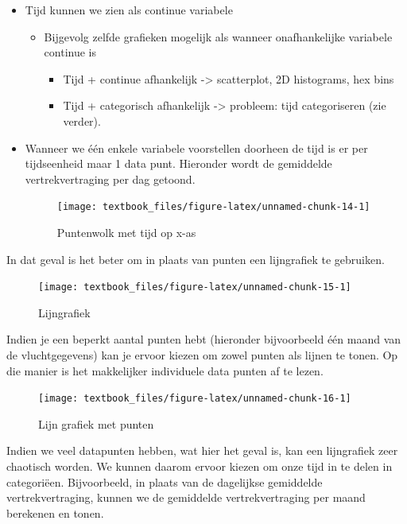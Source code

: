 \documentclass[]{tufte-book}
\providecommand{\tightlist}{%
  \setlength{\itemsep}{0pt}\setlength{\parskip}{0pt}}
\begin{document}
\begin{itemize}
\tightlist
\item
  Tijd kunnen we zien als continue variabele

  \begin{itemize}
  \tightlist
  \item
    Bijgevolg zelfde grafieken mogelijk als wanneer onafhankelijke variabele continue is

    \begin{itemize}
    \tightlist
    \item
      Tijd + continue afhankelijk -\textgreater{} scatterplot, 2D histograms, hex bins
    \item
      Tijd + categorisch afhankelijk -\textgreater{} probleem: tijd categoriseren (zie verder).
    \end{itemize}
  \end{itemize}
\item
  Wanneer we één enkele variabele voorstellen doorheen de tijd is er per tijdseenheid maar 1 data punt. Hieronder wordt de gemiddelde vertrekvertraging per dag getoond.\\

  \begin{figure}
  \texttt{[image: textbook\_files/figure-latex/unnamed-chunk-14-1]} \caption[Puntenwolk met tijd op x-as]{Puntenwolk met tijd op x-as}\label{fig:unnamed-chunk-14}
  \end{figure}
\end{itemize}

In dat geval is het beter om in plaats van punten een lijngrafiek te gebruiken.

\begin{figure}
\texttt{[image: textbook\_files/figure-latex/unnamed-chunk-15-1]} \caption[Lijngrafiek]{Lijngrafiek}\label{fig:unnamed-chunk-15}
\end{figure}

Indien je een beperkt aantal punten hebt (hieronder bijvoorbeeld één maand van de vluchtgegevens) kan je ervoor kiezen om zowel punten als lijnen te tonen. Op die manier is het makkelijker individuele data punten af te lezen.

\begin{figure}
\texttt{[image: textbook\_files/figure-latex/unnamed-chunk-16-1]} \caption[Lijn grafiek met punten]{Lijn grafiek met punten}\label{fig:unnamed-chunk-16}
\end{figure}

Indien we veel datapunten hebben, wat hier het geval is, kan een lijngrafiek zeer chaotisch worden. We kunnen daarom ervoor kiezen om onze tijd in te delen in categoriëen. Bijvoorbeeld, in plaats van de dagelijkse gemiddelde vertrekvertraging, kunnen we de gemiddelde vertrekvertraging per maand berekenen en tonen.
\end{document}
